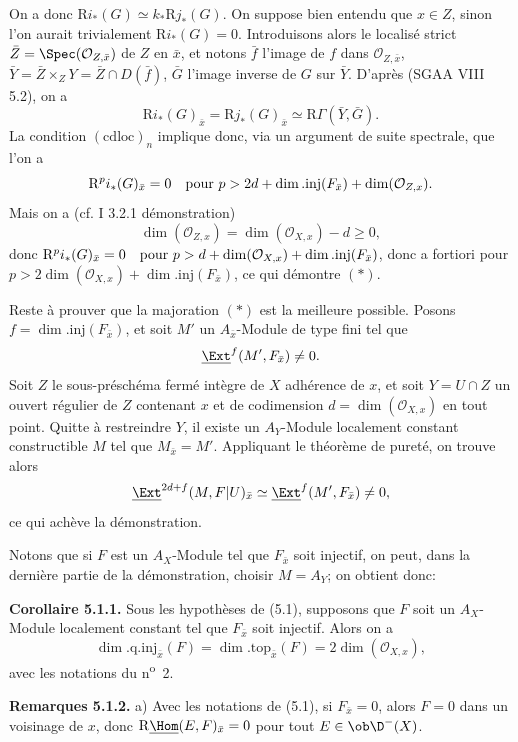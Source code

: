 On a
donc $\mathrm{R} i_*(G)\simeq k_*\mathrm{R} j_*(G)$. On suppose bien entendu que $x\in Z$, sinon l'on aurait trivialement $\mathrm{R} i_*(G)=0$. Introduisons alors le localisé strict $\bar{Z}=\Spec(\mathcal{O}_{Z,\bar{x}})$ de $Z$ en $\bar{x}$, et notons $\bar{f}$ l'image de $f$ dans $\mathcal{O}_{Z,\bar{x}}$, $\bar{Y}=\bar{Z}\times_ZY=\bar{Z}\cap D(\bar{f})$, $\bar{G}$ l'image inverse de $G$ sur $\bar{Y}$. D'après (SGAA VIII 5.2), on a
\[
        \mathrm{R} i_*(G)_{\bar{x}}=\mathrm{R} j_*(G)_{\bar{x}}\simeq \mathrm{R}\Gamma(\bar{Y},\bar{G}).
\]
La condition $(\mathrm{cdloc})_n$ implique donc, via un argument de suite spectrale, que l'on a
\[
        \mathrm{R}^p i_*(G)_{\bar{x}}=0\quad\hbox{pour }p>2d+\dim.\mathrm{inj}(F_{\bar{x}})+\dim(\mathcal{O}_{Z,x}).
\]
Mais on a (cf. I 3.2.1 démonstration)
\[
        \dim(\mathcal{O}_{Z,x})=\dim(\mathcal{O}_{X,x})-d\geq0,
\]
donc $\mathrm{R}^p i_*(G)_{\bar{x}}=0\quad\hbox{pour }p>d+\dim(\mathcal{O}_{X,x})+\dim.\mathrm{inj}(F_{\bar{x}})$,
donc a fortiori pour $p>2\dim(\mathcal{O}_{X,x})+\dim.\mathrm{inj}(F_{\bar{x}})$, ce qui démontre $(*)$.

Reste à prouver que la majoration $(*)$ est la meilleure possible. Posons $f=\dim.\mathrm{inj}(F_{\bar{x}})$, et soit $M'$ un $A_{\bar{x}}$-Module de type fini tel que
\[
        \underline{\Ext}^f(M',F_{\bar{x}})\neq0.
\]
Soit $Z$ le sous-préschéma fermé intègre de $X$ adhérence de $x$, et soit $Y=U\cap Z$ un ouvert régulier de $Z$ contenant $x$ et de codimension $d=\dim(\mathcal{O}_{X,x})$ en tout point. Quitte à restreindre $Y$, il existe un $A_Y$-Module localement constant constructible $M$ tel que $M_{\bar{x}}=M'$. Appliquant le théorème de pureté, on trouve alors
\[
        \underline{\Ext}^{2d+f}(M,F|U)_{\bar{x}}\simeq \underline{\Ext}^f(M',F_{\bar{x}})\neq0,
\]
ce qui achève la démonstration.

Notons que si $F$ est un $A_X$-Module tel que $F_{\bar{x}}$ soit injectif, on peut, dans la dernière partie de la démonstration, choisir $M=A_Y$; on obtient donc:

\textbf{Corollaire 5.1.1.} Sous les hypothèses de (5.1), supposons que $F$ soit un $A_X$-Module localement constant tel que $F_{\bar{x}}$ soit injectif. Alors on a
\[
        \dim.\mathrm{q.inj}_{\bar{x}}(F)=\dim.\mathrm{top}_{\bar{x}}(F)=2\dim(\mathcal{O}_{X,x}),
\]
avec les notations du n\textsuperscript{o}~2.

\textbf{Remarques 5.1.2.} a) Avec les notations de (5.1), si $F_{\bar{x}}=0$, alors $F=0$ dans un voisinage de $x$, donc $\mathrm{R}\underline{\Hom}(E,F)_{\bar{x}}=0$ pour tout $E\in\ob\D^{-}(X)$.

